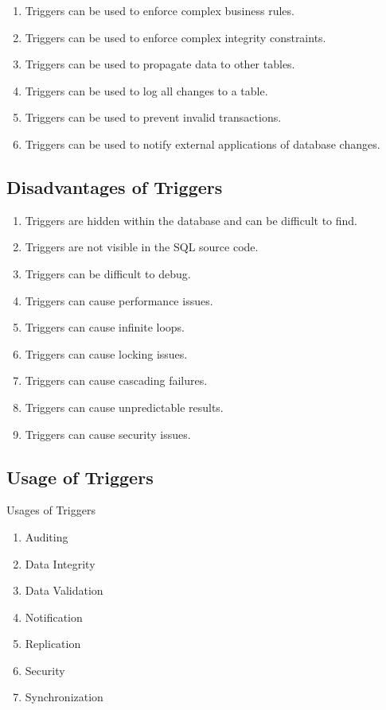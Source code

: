 \documentclass[11pt]{article}
\begin{document}
\begin{enumerate}
    \item Triggers can be used to enforce complex business rules.
    \item Triggers can be used to enforce complex integrity constraints.
    \item Triggers can be used to propagate data to other tables.
    \item Triggers can be used to log all changes to a table.
    \item Triggers can be used to prevent invalid transactions.
    \item Triggers can be used to notify external applications of database changes.
\end{enumerate}


\subsection{Disadvantages of Triggers}

\begin{enumerate}
    \item Triggers are hidden within the database and can be difficult to find.
    \item Triggers are not visible in the SQL source code.
    \item Triggers can be difficult to debug.
    \item Triggers can cause performance issues.
    \item Triggers can cause infinite loops.
    \item Triggers can cause locking issues.
    \item Triggers can cause cascading failures.
    \item Triggers can cause unpredictable results.
    \item Triggers can cause security issues.
\end{enumerate}

\subsection{Usage of Triggers}
Usages of Triggers

\begin{enumerate}
    \item Auditing
    \item Data Integrity
    \item Data Validation
    \item Notification
    \item Replication
    \item Security
    \item Synchronization
\end{enumerate}
\end{document}
